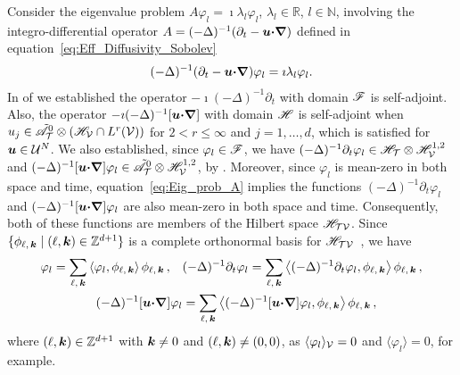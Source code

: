 \documentclass[amsa]{ipart}
\begin{document}
Consider the eigenvalue problem $A\varphi_l=\imath\lambda_l\varphi_l$,
$\lambda_l\in\mathbb{R}$, $l\in\mathbb{N}$, involving the integro-differential
operator $A=(-\Delta)^{-1}(\partial_t-\boldsymbol{u} \mbox{\boldmath${\cdot}$}\mbox{\boldmath${\nabla}$})$ defined in
equation~\eqref{eq:Eff_Diffusivity_Sobolev}
%
\begin{align}\label{eq:Eig_prob_A}
  (-\Delta)^{-1}(\partial_t-\vecu \bcdot\bnabla)\varphi_l=\imath\lambda_l\varphi_l.
\end{align}
%
In  of  we
established the operator $-\imath(-\Delta)^{-1}\partial_t$ with domain $\mathscr{F}$ is
self-adjoint. Also, the operator $-\imath(-\Delta)^{-1}[\boldsymbol{u}\mbox{\boldmath${\cdot}$}\mbox{\boldmath${\nabla}$}]$
with domain $\mathscr{H}$ is self-adjoint when
$u_j\in\tilde{\mathscr{A}}^0_{\mathcal{T}}\otimes(\mathscr{H}_{\mathcal{V}}\cap L^r(\mathcal{V}))$ for $2<r\leq\infty$ and
$j=1,\ldots,d$, which is
satisfied for $\boldsymbol{u}\in\mathcal{U}^N$. We also established, since
$\varphi_l\in\mathscr{F}$, we have 
$(-\Delta)^{-1}\partial_t\varphi_l\in\mathscr{H}_{\mathcal{T}}\otimes\mathscr{H}^{1,2}_{\mathcal{V}}$ and
$(-\Delta)^{-1}[\boldsymbol{u}\mbox{\boldmath${\cdot}$}\mbox{\boldmath${\nabla}$}]\varphi_l\in\tilde{\mathscr{A}}^0_{\mathcal{T}}\otimes\mathscr{H}^{1,2}_{\mathcal{V}}$,
by . Moreover,
since $\varphi_l$ is mean-zero in both space and time,
equation~\eqref{eq:Eig_prob_A} 
implies the functions $(-\Delta)^{-1}\partial_t\varphi_l$ 
and $(-\Delta)^{-1}[\boldsymbol{u}\mbox{\boldmath${\cdot}$}\mbox{\boldmath${\nabla}$}]\varphi_l$ are also mean-zero in both
space and time. Consequently, both of these functions are members of the
Hilbert space $\mathscr{H}_{\mathcal{T}\mathcal{V}}$. Since $\{\phi_{\ell,\,\boldsymbol{k}} \;|\;
(\ell,\boldsymbol{k})\in\mathbb{Z}^{d+1}\}$ is a complete orthonormal basis
for $\mathscr{H}_{\mathcal{T}\mathcal{V}}$~\cite{Folland:99:RealAnalysis}, we have
% 
\begin{align}\label{eq:Fourier_Eig_fun}
  \varphi_l=\sum_{\ell,\,\veck}\left\langle\varphi_l,\phi_{\ell,\,\veck}\right\rangle\phi_{\ell,\,\veck}\,,
  \quad
  &(-\Delta)^{-1}\partial_t\varphi_l=\sum_{\ell,\,\veck}\left\langle(-\Delta)^{-1}\partial_t\varphi_l,\phi_{\ell,\,\veck}\right\rangle\phi_{\ell,\,\veck}\,,
  \\
  (-\Delta)^{-1}[\vecu\bcdot\bnabla]\varphi_l
  &=\sum_{\ell,\,\veck}
  \left\langle(-\Delta)^{-1}[\vecu\bcdot\bnabla]\varphi_l,\phi_{\ell,\,\veck}\right\rangle\phi_{\ell,\,\veck}\,,
  \notag
\end{align}
%
where $(\ell,\boldsymbol{k})\in\mathbb{Z}^{d+1}$ with $\boldsymbol{k}\neq0$ and
$(\ell,\boldsymbol{k})\neq(0,0)$, as $\langle\varphi_l\rangle_{\mathcal{V}}=0$ and $\langle\varphi_l\rangle=0$, for example.
\end{document}
